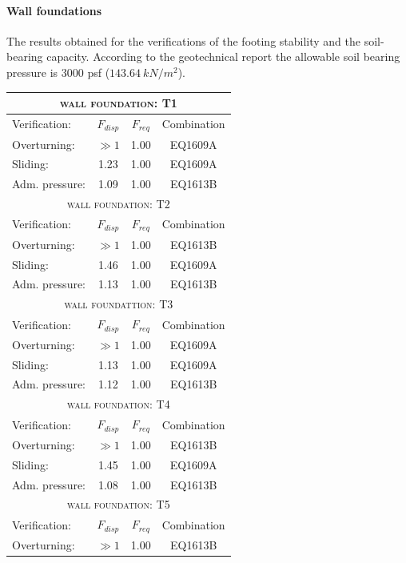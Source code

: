 \paragraph{Wall foundations}
The results obtained for the verifications of the footing stability and the soil-bearing capacity. According to the geotechnical report the allowable soil bearing pressure is 3000 psf ($143.64\ kN/m^2$).
\begin{center}
\begin{tabular}{|l|c|c|c|}
\hline
\multicolumn{4}{|c|}{\textsc{wall foundation: T1}}\\
\hline
Verification:  & $F_{disp}$ & $F_{req}$ & Combination\\
\hline
Overturning:  & $\gg 1$ & 1.00 & EQ1609A\\
Sliding:  & 1.23 & 1.00 & EQ1609A\\
Adm. pressure:  & 1.09 & 1.00 & EQ1613B\\
\hline
\multicolumn{4}{|c|}{\textsc{wall foundation: T2}}\\
\hline
Verification:  & $F_{disp}$ & $F_{req}$ & Combination\\
\hline
Overturning:  & $\gg 1$ & 1.00 & EQ1613B\\
Sliding:  & 1.46 & 1.00 & EQ1609A\\
Adm. pressure:  & 1.13 & 1.00 & EQ1613B\\
\hline
\multicolumn{4}{|c|}{\textsc{wall foundattion: T3}}\\
\hline
Verification:  & $F_{disp}$ & $F_{req}$ & Combination\\
\hline
Overturning:  & $\gg 1$ & 1.00 & EQ1609A\\
Sliding:  & 1.13 & 1.00 & EQ1609A\\
Adm. pressure:  & 1.12 & 1.00 & EQ1613B\\
\hline
\multicolumn{4}{|c|}{\textsc{wall foundation: T4}}\\
\hline
Verification:  & $F_{disp}$ & $F_{req}$ & Combination\\
\hline
Overturning:  & $\gg 1$ & 1.00 & EQ1613B\\
Sliding:  & 1.45 & 1.00 & EQ1609A\\
Adm. pressure:  & 1.08 & 1.00 & EQ1613B\\
\hline
\multicolumn{4}{|c|}{\textsc{wall foundation: T5 }}\\
\hline
Verification:  & $F_{disp}$ & $F_{req}$ & Combination\\
\hline
Overturning:  & $\gg 1$ & 1.00 & EQ1613B\\

\end{tabular}
\end{center}
